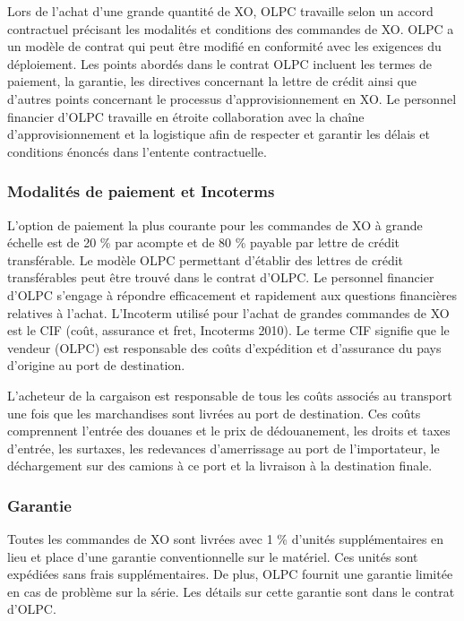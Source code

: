 \documentclass[11pt]{article}
\begin{document}
Lors de l'achat d'une grande quantité de XO, OLPC travaille selon un accord
contractuel précisant les modalités et conditions des commandes de XO. OLPC
a un modèle de contrat qui peut être modifié en conformité avec les
exigences du déploiement. Les points abordés dans le contrat OLPC incluent
les termes de paiement, la garantie, les directives concernant la lettre de
crédit ainsi que d'autres points concernant le processus
d'approvisionnement en XO.  Le personnel financier d'OLPC travaille en
étroite collaboration avec la chaîne d'approvisionnement et la logistique
afin de respecter et garantir les délais et conditions énoncés dans
l'entente contractuelle.
\subsubsection{Modalités de paiement et Incoterms}
\label{sec-8-2-1}



L'option de paiement la plus courante pour les commandes de XO à grande
échelle est de 20 \% par acompte et de 80 \% payable par lettre de crédit
transférable. Le modèle OLPC permettant d'établir des lettres de crédit
transférables peut être trouvé dans le contrat d'OLPC. Le personnel
financier d'OLPC s'engage à répondre efficacement et rapidement aux
questions financières relatives à l'achat. L'Incoterm utilisé pour l'achat
de grandes commandes de XO est le CIF (coût, assurance et fret, Incoterms
2010). Le terme CIF signifie que le vendeur (OLPC) est responsable des
coûts d'expédition et d'assurance du pays d'origine au port de
destination.

L'acheteur de la cargaison est responsable de tous les coûts associés au
transport une fois que les marchandises sont livrées au port de
destination. Ces coûts comprennent l'entrée des douanes et le prix de
dédouanement, les droits et taxes d'entrée, les surtaxes, les redevances
d'amerrissage au port de l'importateur, le déchargement sur des camions à
ce port et la livraison à la destination finale.
\subsubsection{Garantie}
\label{sec-8-2-2}



Toutes les commandes de XO sont livrées avec 1 \% d'unités supplémentaires
en lieu et place d'une garantie conventionnelle sur le matériel. Ces unités
sont expédiées sans frais supplémentaires. De plus, OLPC fournit une
garantie limitée en cas de problème sur la série. Les détails sur cette
garantie sont dans le contrat d'OLPC.
\end{document}
